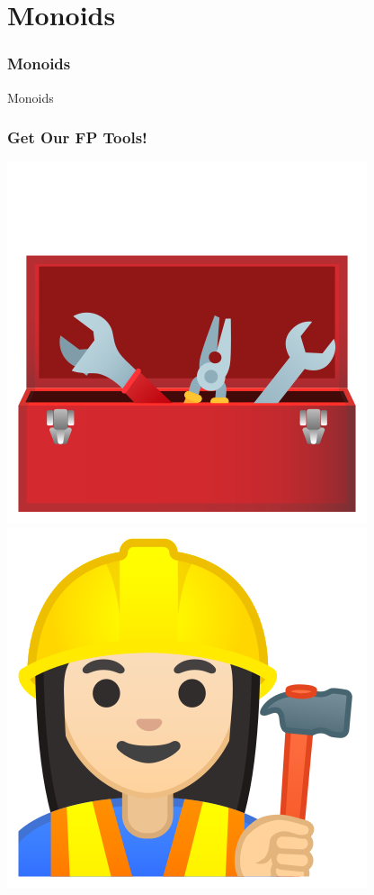 \documentclass[aspectratio=169]{beamer}
\begin{document}
\section{Monoids}\label{sec:monoids}

\begin{frame}
  \frametitle{Monoids}
  \begin{center}
    \huge
    Monoids
  \end{center}
\end{frame}

\begin{frame}
  \frametitle{Get Our FP Tools!}
  \begin{center}
    \includegraphics{static-images/toolbox.png}
    \includegraphics{static-images/construction-worker.png}
  \end{center}
\end{frame}
\end{document}
